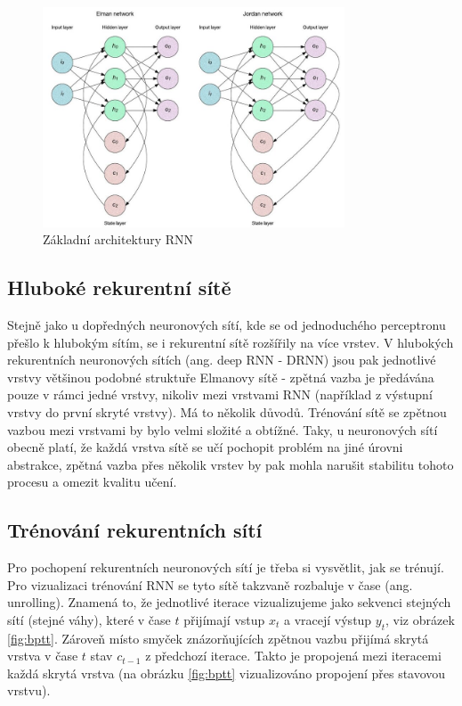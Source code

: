 \begin{figure}[]
    \centering
    \includegraphics[width=0.8\textwidth]{Figures/rnn.png}
    \caption{Základní architektury RNN \cite{aksoy}}
    \label{fig:rnn}
\end{figure}

\subsection{Hluboké rekurentní sítě}

Stejně jako u dopředných neuronových sítí, kde se od jednoduchého perceptronu
přešlo k hlubokým sítím, se i rekurentní sítě rozšířily na více vrstev. V
hlubokých rekurentních neuronových sítích (ang. deep RNN - DRNN) jsou pak
jednotlivé vrstvy většinou podobné struktuře Elmanovy sítě - zpětná vazba je
předávána pouze v rámci jedné vrstvy, nikoliv mezi vrstvami RNN (například z
výstupní vrstvy do první skryté vrstvy). Má to několik důvodů. Trénování sítě
se zpětnou vazbou mezi vrstvami by bylo velmi složité a obtížné. Taky, u
neuronových sítí obecně platí, že každá vrstva sítě se učí pochopit problém na
jiné úrovni abstrakce, zpětná vazba přes několik vrstev by pak mohla narušit
stabilitu tohoto procesu a omezit kvalitu učení.

\subsection{Trénování rekurentních sítí}

Pro pochopení rekurentních neuronových sítí je třeba si vysvětlit, jak se
trénují. Pro vizualizaci trénování RNN se tyto sítě takzvaně rozbaluje v čase
(ang. unrolling). Znamená to, že jednotlivé iterace vizualizujeme jako sekvenci
stejných sítí (stejné váhy), které v čase $t$ přijímají vstup $x_t$ a vracejí
výstup $y_t$, viz obrázek \ref{fig:bptt}. Zároveň místo smyček znázorňujících
zpětnou vazbu přijímá skrytá vrstva v čase $t$ stav $c_{t-1}$ z předchozí
iterace. Takto je propojená mezi iteracemi každá skrytá vrstva (na obrázku
\ref{fig:bptt} vizualizováno propojení přes stavovou vrstvu).

